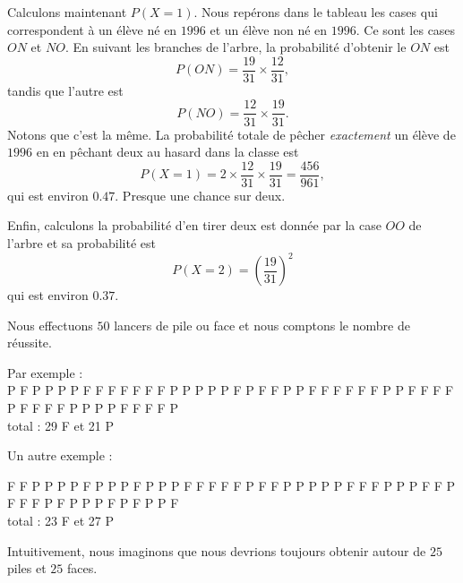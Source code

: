 Calculons maintenant \( P(X=1)\). Nous repérons dans le tableau les cases qui correspondent à un élève né en \( 1996\) et un élève non né en \( 1996\). Ce sont les cases \( ON\) et \( NO\). En suivant les branches de l'arbre, la probabilité d'obtenir le \( ON\) est 
\begin{equation}
    P(ON)=\frac{ 19 }{ 31 }\times \frac{ 12 }{ 31 },
\end{equation}
tandis que l'autre est
\begin{equation}
    P(NO)=\frac{ 12 }{ 31 }\times \frac{ 19 }{ 31 }.
\end{equation}
Notons que c'est la même. La probabilité totale de pêcher \emph{exactement} un élève de \( 1996\) en en pêchant deux au hasard dans la classe est
\begin{equation}
    P(X=1)=2\times\frac{ 12 }{ 31 }\times \frac{ 19 }{ 31 }=\frac{ 456 }{ 961 },
\end{equation}
qui est environ \( 0.47\). Presque une chance sur deux.

Enfin, calculons la probabilité d'en tirer deux est donnée par la case \( OO\) de l'arbre et sa probabilité est
\begin{equation}
    P(X=2)=\left( \frac{ 19 }{ 31 } \right)^2
\end{equation}
qui est environ \( 0.37\).


\begin{example}
Nous effectuons \( 50\) lancers de pile ou face et nous comptons le nombre de réussite.

Par exemple :\\
P F P P P P F F F F F F F P P P P P F P F F P P F F F F F F P P F F F F P F F F F P P P P F F F F P \\
 total : 29 F et  21 P
 
Un autre exemple :

F F P P P P F P P P F P P P F F F F F P F F P P P P P F F F P P P F F P F F F P F P P P F P F P P F \\
 total : 23 F et  27 P

 Intuitivement, nous imaginons que nous devrions toujours obtenir autour de \( 25\) piles et \( 25\) faces.
    
\end{example}

